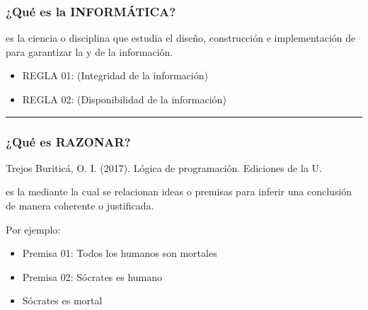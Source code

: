 \documentclass[letterpaper,10pt,spanish]{sphinxmanual}
\begin{document}
\subsubsection{¿Qué es la INFORMÁTICA?}
\label{\detokenize{1_guias/8logica/G821:que-es-la-informatica}}
\sphinxAtStartPar
\sphinxfootnotemark[2]  es la ciencia o disciplina que estudia el diseño, construcción e implementación de  para garantizar la  y  de la información.
\begin{itemize}
\item {} 
\sphinxAtStartPar
REGLA 01: (Integridad de la información)
\begin{quote}

\sphinxAtStartPar
{}
\end{quote}

\item {} 
\sphinxAtStartPar
REGLA 02: (Disponibilidad de la información)
\begin{quote}

\sphinxAtStartPar
{}
\end{quote}

\end{itemize}


\bigskip\hrule\bigskip



\subsubsection{¿Qué es RAZONAR?}
\label{\detokenize{1_guias/8logica/G821:que-es-razonar}}
\sphinxAtStartPar
%
\begin{footnote}[3]\sphinxAtStartFootnote
Trejos Buriticá, O. I. (2017). Lógica de programación. Ediciones de la U.
%
\end{footnote}  es la  mediante la cual se relacionan ideas o premisas para inferir una conclusión de manera coherente o justificada.

\sphinxAtStartPar
Por ejemplo:
\begin{itemize}
\item {} 
\sphinxAtStartPar
Premisa 01: Todos los humanos son mortales

\item {} 
\sphinxAtStartPar
Premisa 02: Sócrates es humano

\item {} 
\sphinxAtStartPar
{} Sócrates es mortal

\end{itemize}
\end{document}
